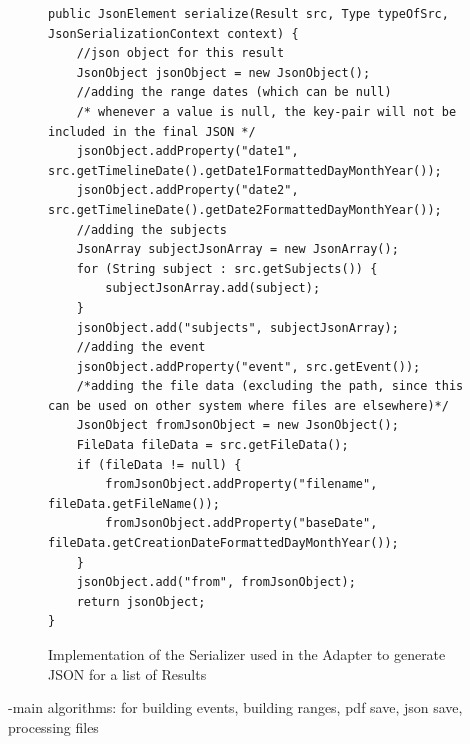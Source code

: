 \begin{figure}[H]
\begin{lstlisting}
public JsonElement serialize(Result src, Type typeOfSrc, JsonSerializationContext context) {
	//json object for this result
    JsonObject jsonObject = new JsonObject();
	//adding the range dates (which can be null)
	/* whenever a value is null, the key-pair will not be included in the final JSON */
	jsonObject.addProperty("date1", src.getTimelineDate().getDate1FormattedDayMonthYear());
	jsonObject.addProperty("date2", src.getTimelineDate().getDate2FormattedDayMonthYear());
	//adding the subjects
	JsonArray subjectJsonArray = new JsonArray();
	for (String subject : src.getSubjects()) {
		subjectJsonArray.add(subject);
	}
	jsonObject.add("subjects", subjectJsonArray);
	//adding the event
	jsonObject.addProperty("event", src.getEvent());
	/*adding the file data (excluding the path, since this can be used on other system where files are elsewhere)*/
	JsonObject fromJsonObject = new JsonObject();
	FileData fileData = src.getFileData();
	if (fileData != null) {
		fromJsonObject.addProperty("filename", fileData.getFileName());
		fromJsonObject.addProperty("baseDate", fileData.getCreationDateFormattedDayMonthYear());
	}
	jsonObject.add("from", fromJsonObject);
	return jsonObject;
}
\end{lstlisting}
\caption{Implementation of the Serializer used in the Adapter to generate JSON for a list of Results}
\label{fig:adapterGsonImplemented}
\end{figure}

-main algorithms: for building events, building ranges, pdf save, json save, processing files
